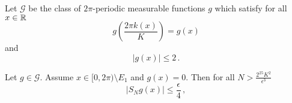 Let $\mathcal{G}$ be the class of $2\pi$-periodic measurable functions $g$ which satisfy for all $x\in \mathbb{R}$
\begin{equation}
    g(\frac{2\pi k(x)}K)=g(x)
\end{equation}
and
\begin{equation}
    |g(x)|\le 2\, .
\end{equation}



\begin{lemma}\label{lem g with zero}
Let $g\in \mathcal{G}$. Assume
$x\in [0,2\pi)\setminus E_1 $ and $g(x)=0$.
Then for all $N>\frac {2^25 K^2}{\epsilon ^3}$
\begin{equation}\label{single char f}
|S_Ng(x)|\le \frac \epsilon 4\, ,
\end{equation}
\end{lemma}
